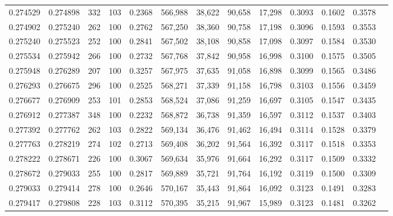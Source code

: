 \begin{tabular}{rrrrrrrrrrrrr}
0.274529 & 0.274898 &   332 & 103 &                                     0.2368 & 566,988 &  38,622 &  90,658 &  17,298 & 0.3093 & 0.1602 & 0.3578 \\
0.274902 & 0.275240 &   262 & 100 &                                     0.2762 & 567,250 &  38,360 &  90,758 &  17,198 & 0.3096 & 0.1593 & 0.3553 \\
0.275240 & 0.275523 &   252 & 100 &                                     0.2841 & 567,502 &  38,108 &  90,858 &  17,098 & 0.3097 & 0.1584 & 0.3530 \\
0.275534 & 0.275942 &   266 & 100 &                                     0.2732 & 567,768 &  37,842 &  90,958 &  16,998 & 0.3100 & 0.1575 & 0.3505 \\
0.275948 & 0.276289 &   207 & 100 &                                     0.3257 & 567,975 &  37,635 &  91,058 &  16,898 & 0.3099 & 0.1565 & 0.3486 \\
0.276293 & 0.276675 &   296 & 100 &                                     0.2525 & 568,271 &  37,339 &  91,158 &  16,798 & 0.3103 & 0.1556 & 0.3459 \\
0.276677 & 0.276909 &   253 & 101 &                                     0.2853 & 568,524 &  37,086 &  91,259 &  16,697 & 0.3105 & 0.1547 & 0.3435 \\
0.276912 & 0.277387 &   348 & 100 &                                     0.2232 & 568,872 &  36,738 &  91,359 &  16,597 & 0.3112 & 0.1537 & 0.3403 \\
0.277392 & 0.277762 &   262 & 103 &                                     0.2822 & 569,134 &  36,476 &  91,462 &  16,494 & 0.3114 & 0.1528 & 0.3379 \\
0.277763 & 0.278219 &   274 & 102 &                                     0.2713 & 569,408 &  36,202 &  91,564 &  16,392 & 0.3117 & 0.1518 & 0.3353 \\
0.278222 & 0.278671 &   226 & 100 &                                     0.3067 & 569,634 &  35,976 &  91,664 &  16,292 & 0.3117 & 0.1509 & 0.3332 \\
0.278672 & 0.279033 &   255 & 100 &                                     0.2817 & 569,889 &  35,721 &  91,764 &  16,192 & 0.3119 & 0.1500 & 0.3309 \\
0.279033 & 0.279414 &   278 & 100 &                                     0.2646 & 570,167 &  35,443 &  91,864 &  16,092 & 0.3123 & 0.1491 & 0.3283 \\
0.279417 & 0.279808 &   228 & 103 &                                     0.3112 & 570,395 &  35,215 &  91,967 &  15,989 & 0.3123 & 0.1481 & 0.3262 \\

\end{tabular}
